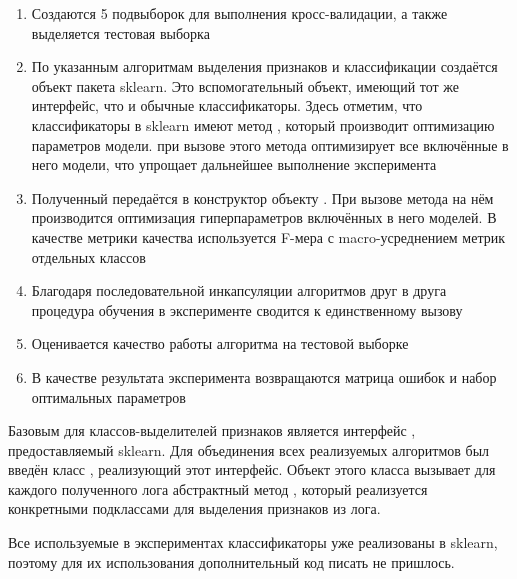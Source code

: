 \begin{enumerate}
\item Создаются 5 подвыборок для выполнения кросс-валидации, а также выделяется тестовая выборка
\item По указанным алгоритмам выделения признаков и классификации создаётся объект  пакета sklearn. Это вспомогательный объект, имеющий тот же интерфейс, что и обычные классификаторы. Здесь отметим, что классификаторы в sklearn имеют метод , который производит оптимизацию параметров модели.  при вызове этого метода оптимизирует все включённые в него модели, что упрощает дальнейшее выполнение эксперимента
\item Полученный  передаётся в конструктор объекту . При вызове метода  на нём производится оптимизация гиперпараметров включённых в него моделей. В качестве метрики качества используется F-мера с macro-усреднением метрик отдельных классов
\item Благодаря последовательной инкапсуляции алгоритмов друг в друга процедура обучения в эксперименте сводится к единственному вызову 
\item Оценивается качество работы алгоритма на тестовой выборке
\item В качестве результата эксперимента возвращаются матрица ошибок и набор оптимальных параметров
\end{enumerate}

Базовым для классов-выделителей признаков является интерфейс , предоставляемый sklearn. Для объединения всех реализуемых алгоритмов был введён класс , реализующий этот интерфейс. Объект этого класса вызывает для каждого полученного лога абстрактный метод , который реализуется конкретными подклассами для выделения признаков из лога. 

Все используемые в экспериментах классификаторы уже реализованы в sklearn, поэтому для их использования дополнительный код писать не пришлось. 

